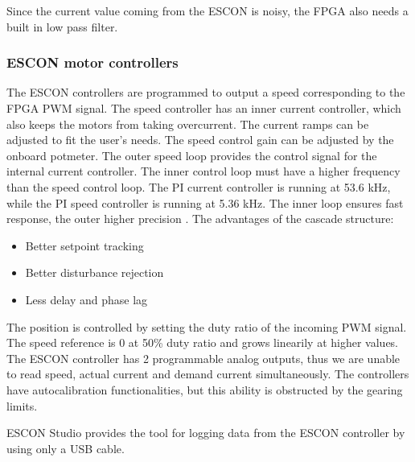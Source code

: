 Since the current value coming from the ESCON is noisy, the FPGA also needs a built in low pass filter.

\subsubsection{ESCON motor controllers}
\label{escon_con}

The ESCON controllers are programmed to output a speed corresponding to the FPGA PWM signal. The speed controller has an inner current controller, which also keeps the motors from taking overcurrent. The current ramps can be adjusted to fit the user's needs. The speed control gain can be adjusted by the onboard potmeter. 
The outer speed loop provides the control signal for the internal current controller. The inner control loop must have a higher frequency than the speed control loop. The PI current controller is running at 53.6 kHz, while the PI speed controller is running at 5.36 kHz. The inner loop ensures fast response, the outer higher precision \cite{cascade_cont}. The advantages of the cascade structure:

\begin{itemize}
	\item Better setpoint tracking
	\item Better disturbance rejection
	\item Less delay and phase lag
\end{itemize}

The position is controlled by setting the duty ratio of the incoming PWM signal. The speed reference is 0 at 50\% duty ratio and grows linearily at higher values.
The ESCON controller has 2 programmable analog outputs, thus we are unable to read speed, actual current and demand current simultaneously.
The controllers have autocalibration functionalities, but this ability is obstructed by the gearing limits.

ESCON Studio provides the tool for logging data from the ESCON controller by using only a USB cable.